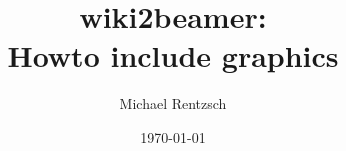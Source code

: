 \documentclass{beamer}
\title{wiki2beamer: \\ Howto include graphics}
\author{Michael Rentzsch}
\date{\today}
\begin{document}
\frame{\titlepage}


\end{document}
